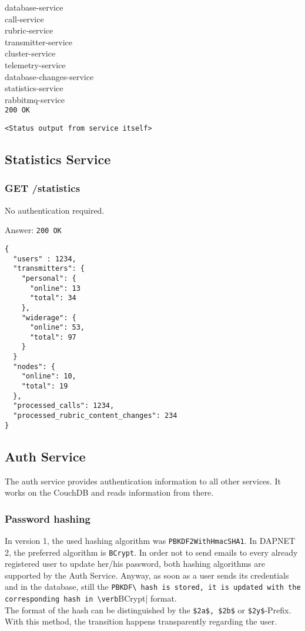 database-service\\
call-service\\
rubric-service\\
transmitter-service\\
cluster-service\\
telemetry-service\\
database-changes-service\\
statistics-service\\
rabbitmq-service\\


\texttt{200 OK}
\begin{lstlisting}
<Status output from service itself>
\end{lstlisting}


\subsection{Statistics Service}

\subsubsection{GET /statistics}
No authentication required.

Answer:
\texttt{200 OK}
\begin{lstlisting}
{
  "users" : 1234,
  "transmitters": {
    "personal": {
      "online": 13
      "total": 34
    },
    "widerage": {
      "online": 53,
      "total": 97
    }
  }
  "nodes": {
    "online": 10,
    "total": 19
  },
  "processed_calls": 1234,
  "processed_rubric_content_changes": 234
}
\end{lstlisting}


\newpage
\subsection{Auth Service}
\label{protocoldef:Auth}
The auth service provides authentication information to all other services. It works on the CouchDB and reads information from there.

\subsubsection{Password hashing}
In version 1, the used hashing algorithm was \verb|PBKDF2WithHmacSHA1|. In DAPNET 2, the preferred algorithm is \verb|BCrypt|. In order not to send emails to every already registered user to update her/his password, both hashing algorithms are supported by the Auth Service. Anyway, as soon as a user sends its credentials and in the database, still the \verb|PBKDF\ hash is stored, it is updated with the corresponding hash in \verb|BCrypt| format.\\
The format of the hash can be distinguished by the \verb|$2a$, $2b$| or \verb|$2y$|-Prefix. With this method, the transition happens transparently regarding the user.


